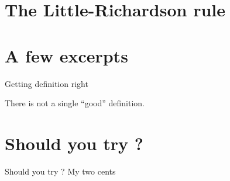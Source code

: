 \documentclass[compress,11pt]{beamer}
\begin{document}
\section{The Little-Richardson rule}

\section{A few excerpts}

\begin{frame}{Getting definition right}

There is not a single ``good'' definition.
\end{frame}

\section{Should you try ?}

\begin{frame}{Should you try ? My two cents}
  
\end{frame}
\end{document}
